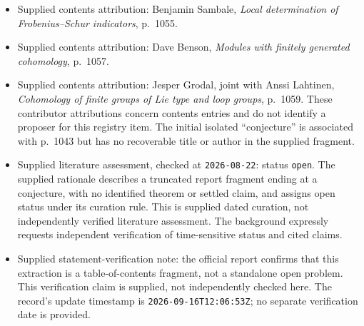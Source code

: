 \documentclass[11pt]{article}
\begin{document}
\begin{itemize}
\item Supplied contents attribution: Benjamin Sambale, \emph{Local determination of Frobenius--Schur indicators}, p.\ 1055.
\item Supplied contents attribution: Dave Benson, \emph{Modules with finitely generated cohomology}, p.\ 1057.
\item Supplied contents attribution: Jesper Grodal, joint with Anssi Lahtinen, \emph{Cohomology of finite groups of Lie type and loop groups}, p.\ 1059. These contributor attributions concern contents entries and do not identify a proposer for this registry item. The initial isolated ``conjecture'' is associated with p.\ 1043 but has no recoverable title or author in the supplied fragment.
\item Supplied literature assessment, checked at \texttt{2026-08-22}: status \texttt{open}. The supplied rationale describes a truncated report fragment ending at a conjecture, with no identified theorem or settled claim, and assigns open status under its curation rule. This is supplied dated curation, not independently verified literature assessment. The background expressly requests independent verification of time-sensitive status and cited claims.
\item Supplied statement-verification note: the official report confirms that this extraction is a table-of-contents fragment, not a standalone open problem. This verification claim is supplied, not independently checked here. The record's update timestamp is \texttt{2026-09-16T12:06:53Z}; no separate verification date is provided.
\end{itemize}
\end{document}
